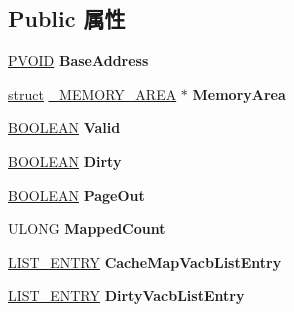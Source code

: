 \subsection*{Public 属性}
\begin{DoxyCompactItemize}
\item 
\mbox{\label{struct___r_o_s___v_a_c_b_aaaae1eb2efe1312e0cae6cd7ed423e66}} 
\hyperlink{interfacevoid}{P\+V\+O\+ID} {\bfseries Base\+Address}
\item 
\mbox{\label{struct___r_o_s___v_a_c_b_afcaa30af4c76d2baed14040ac558d875}} 
\hyperlink{interfacestruct}{struct} \hyperlink{struct___m_e_m_o_r_y___a_r_e_a}{\+\_\+\+M\+E\+M\+O\+R\+Y\+\_\+\+A\+R\+EA} $\ast$ {\bfseries Memory\+Area}
\item 
\mbox{\label{struct___r_o_s___v_a_c_b_a5bee8832046226b44e96ac3a65aab3b3}} 
\hyperlink{_processor_bind_8h_a112e3146cb38b6ee95e64d85842e380a}{B\+O\+O\+L\+E\+AN} {\bfseries Valid}
\item 
\mbox{\label{struct___r_o_s___v_a_c_b_a192b058b34157032c22bce1f09c464b6}} 
\hyperlink{_processor_bind_8h_a112e3146cb38b6ee95e64d85842e380a}{B\+O\+O\+L\+E\+AN} {\bfseries Dirty}
\item 
\mbox{\label{struct___r_o_s___v_a_c_b_ac9b157e7fc4d9fa35776260dc3b46e1b}} 
\hyperlink{_processor_bind_8h_a112e3146cb38b6ee95e64d85842e380a}{B\+O\+O\+L\+E\+AN} {\bfseries Page\+Out}
\item 
\mbox{\label{struct___r_o_s___v_a_c_b_a0190ebc705de89f98bbf299f0516d2f9}} 
U\+L\+O\+NG {\bfseries Mapped\+Count}
\item 
\mbox{\label{struct___r_o_s___v_a_c_b_a172de737122246b8ca54660eb477b4ae}} 
\hyperlink{struct___l_i_s_t___e_n_t_r_y}{L\+I\+S\+T\+\_\+\+E\+N\+T\+RY} {\bfseries Cache\+Map\+Vacb\+List\+Entry}
\item 
\mbox{\label{struct___r_o_s___v_a_c_b_ad4db1cf364e7bb2a7e7b011d42035c3f}} 
\hyperlink{struct___l_i_s_t___e_n_t_r_y}{L\+I\+S\+T\+\_\+\+E\+N\+T\+RY} {\bfseries Dirty\+Vacb\+List\+Entry}
\item 

\end{DoxyCompactItemize}
